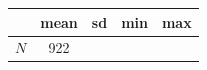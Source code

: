 {
\def\sym#1{\ifmmode^{#1}\else\(^{#1}\)\fi}
\begin{tabular}{l*{1}{cccc}}
\toprule
            &        mean&          sd&         min&         max\\
\midrule
\midrule
\(N\)       &         922&            &            &            \\
\bottomrule
\end{tabular}
}
